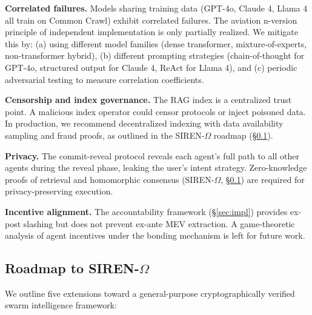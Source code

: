 \documentclass[11pt]{article}
\begin{document}
\textbf{Correlated failures.} Models sharing training data (GPT-4o, Claude 4, Llama 4 all train on Common Crawl) exhibit correlated failures. The aviation n-version principle of independent implementation is only partially realized. We mitigate this by: (a) using different model families (dense transformer, mixture-of-experts, non-transformer hybrid), (b) different prompting strategies (chain-of-thought for GPT-4o, structured output for Claude 4, ReAct for Llama 4), and (c) periodic adversarial testing to measure correlation coefficients.

\textbf{Censorship and index governance.} The RAG index is a centralized trust point. A malicious index operator could censor protocols or inject poisoned data. In production, we recommend decentralized indexing with data availability sampling and fraud proofs, as outlined in the SIREN-$\Omega$ roadmap (\S\ref{sec:roadmap}).

\textbf{Privacy.} The commit-reveal protocol reveals each agent's full path to all other agents during the reveal phase, leaking the user's intent strategy. Zero-knowledge proofs of retrieval and homomorphic consensus (SIREN-$\Omega$, \S\ref{sec:roadmap}) are required for privacy-preserving execution.

\textbf{Incentive alignment.} The accountability framework (\S\ref{sec:impl}) provides ex-post slashing but does not prevent ex-ante MEV extraction. A game-theoretic analysis of agent incentives under the bonding mechanism is left for future work.

\subsection{Roadmap to SIREN-$\Omega$}
\label{sec:roadmap}

We outline five extensions toward a general-purpose cryptographically verified swarm intelligence framework:
\end{document}
